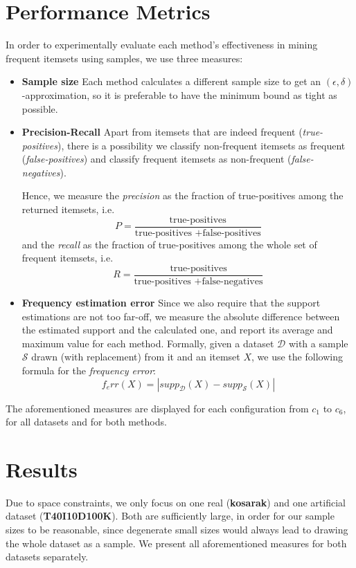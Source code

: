 \documentclass[11pt]{sigplanconf}
\renewcommand\it{\textit}
\renewcommand\bf{\textbf}
\renewcommand\S{\mathcal{S}}
\newcommand\D{\mathcal{D}}
\begin{document}
\section{Performance Metrics}
In order to experimentally evaluate each method's effectiveness in mining frequent itemsets using samples, we use three measures:
\begin{itemize}
\item \bf{Sample size} Each method calculates a different sample size to get an $(\epsilon, \delta)$-approximation, so it is preferable to have the minimum bound as tight as possible.

\item \bf{Precision-Recall} Apart from itemsets that are indeed frequent (\it{true-positives}), there is a possibility we classify non-frequent itemsets as frequent (\it{false-positives}) and classify frequent itemsets as non-frequent (\it{false-negatives}).

Hence, we measure the \it{precision} as the fraction of true-positives among the returned itemsets, i.e.
\[ P = \frac{\text{true-positives}}{\text{true-positives } + \text{false-positives}}
\]
and the \it{recall} as the fraction of true-positives among the whole set of frequent itemsets, i.e.
\[ R = \frac{\text{true-positives}}{\text{true-positives } + \text{false-negatives}}
\]

\item \bf{Frequency estimation error} Since we also require that the support estimations are not too far-off, we measure the absolute difference between the estimated support and the calculated one, and report its average and maximum value for each method. Formally, given a dataset $\D$ with a sample $\S$ drawn (with replacement) from it  and an itemset $X$, we use the following formula for the \textit{frequency error}:
\[ f_err(X) = |supp_{\D}(X) - supp_{\S}(X)|
\]
\end{itemize}

The aforementioned measures are displayed for each configuration from $c_1$ to $c_6$, for all datasets and for both methods.

\section{Results}
Due to space constraints, we only focus on one real (\bf{kosarak}) and one artificial dataset (\bf{T40I10D100K}). Both are sufficiently large, in order for our sample sizes to be reasonable, since degenerate small sizes would always lead to drawing the whole dataset as a sample. We present all aforementioned measures for both datasets separately.
\end{document}
